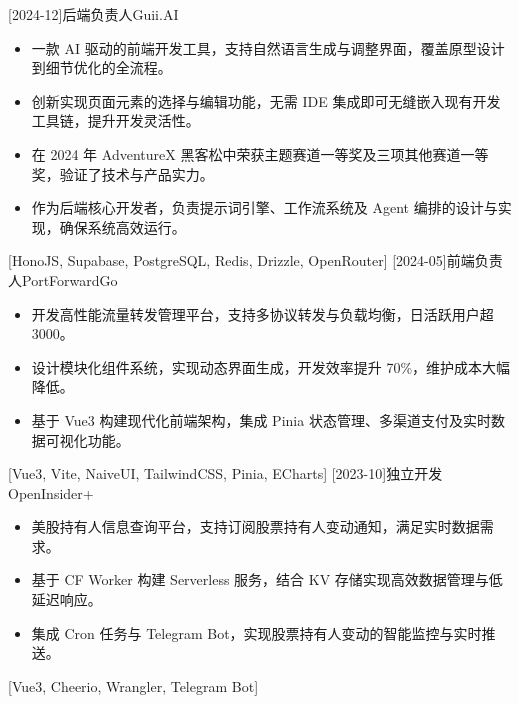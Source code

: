 \documentclass[zh]{resume}
\begin{document}
\begin{projects}
  [2024-12]{后端负责人}{}{Guii.AI}{
    \begin{itemize}
      \item 一款 AI 驱动的前端开发工具，支持自然语言生成与调整界面，覆盖原型设计到细节优化的全流程。
      \item 创新实现页面元素的选择与编辑功能，无需 IDE 集成即可无缝嵌入现有开发工具链，提升开发灵活性。
      \item 在 2024 年 AdventureX 黑客松中荣获主题赛道一等奖及三项其他赛道一等奖，验证了技术与产品实力。
      \item 作为后端核心开发者，负责提示词引擎、工作流系统及 Agent 编排的设计与实现，确保系统高效运行。
    \end{itemize}
  }[HonoJS, Supabase, PostgreSQL, Redis, Drizzle, OpenRouter]
  \separator{0.5ex}
  [2024-05]{前端负责人}{}{PortForwardGo}{
    \begin{itemize}
      \item 开发高性能流量转发管理平台，支持多协议转发与负载均衡，日活跃用户超 3000。
      \item 设计模块化组件系统，实现动态界面生成，开发效率提升 70\%，维护成本大幅降低。
      \item 基于 Vue3 构建现代化前端架构，集成 Pinia 状态管理、多渠道支付及实时数据可视化功能。
    \end{itemize}
  }[Vue3, Vite, NaiveUI, TailwindCSS, Pinia, ECharts]
  \separator{0.5ex}
  [2023-10]{独立开发}{}{OpenInsider+}{
    \begin{itemize}
      \item 美股持有人信息查询平台，支持订阅股票持有人变动通知，满足实时数据需求。
      \item 基于 CF Worker 构建 Serverless 服务，结合 KV 存储实现高效数据管理与低延迟响应。
      \item 集成 Cron 任务与 Telegram Bot，实现股票持有人变动的智能监控与实时推送。
    \end{itemize}
  }[Vue3, Cheerio, Wrangler, Telegram Bot]
\end{projects}
\end{document}
